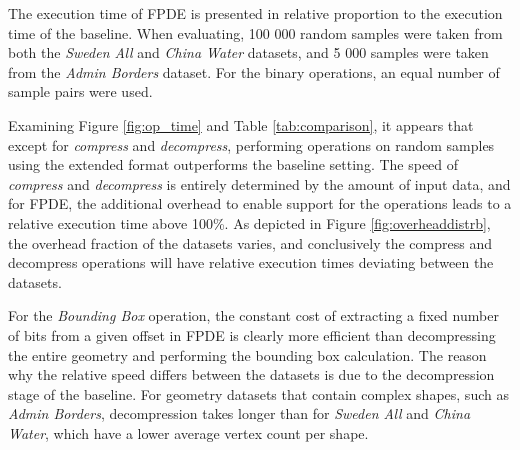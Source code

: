 The execution time of FPDE is presented in relative proportion to the execution time of the baseline. When evaluating, 100 000 random samples were taken from both the \textit{Sweden All} and \textit{China Water} datasets, and 5 000 samples were taken from the \textit{Admin Borders} dataset. For the binary operations, an equal number of sample pairs were used.

\begin{table}[htbp]
\centering
{}
\caption{Table of absolute execution time (µs) for different datasets and operations when using the baseline and FPDE.}
\label{tab:comparison}
\end{table}

Examining Figure \ref{fig:op_time} and Table \ref{tab:comparison}, it appears that except for \textit{compress} and \textit{decompress}, performing operations on random samples using the extended format outperforms the baseline setting. The speed of  \textit{compress} and \textit{decompress} is entirely determined by the amount of input data, and for FPDE, the additional overhead to enable support for the operations leads to a relative execution time above 100\%. As depicted in Figure \ref{fig:overheaddistrb}, the overhead fraction of the datasets varies, and conclusively the compress and decompress operations will have relative execution times deviating between the datasets.


For the \textit{Bounding Box} operation, the constant cost of extracting a fixed number of bits from a given offset in FPDE is clearly more efficient than decompressing the entire geometry and performing the bounding box calculation. The reason why the relative speed differs between the datasets is due to the decompression stage of the baseline. For geometry datasets that contain complex shapes, such as \textit{Admin Borders}, decompression takes longer than for \textit{Sweden All} and \textit{China Water}, which have a lower average vertex count per shape.


